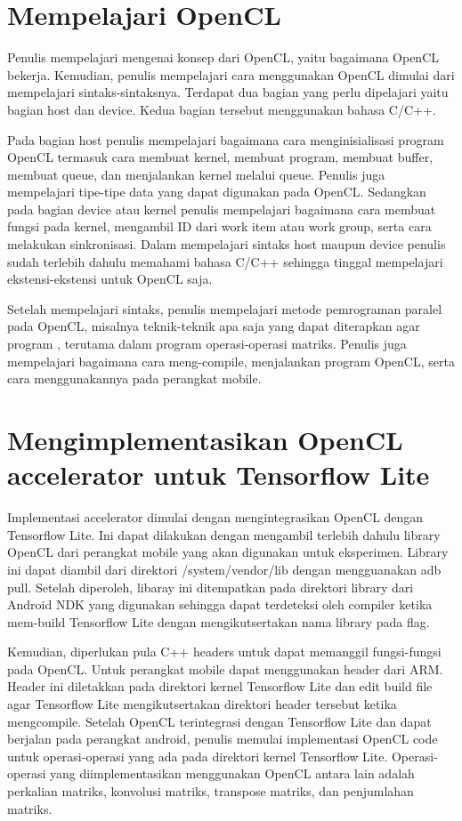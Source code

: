 \section{Mempelajari OpenCL}
Penulis mempelajari mengenai konsep dari OpenCL, yaitu bagaimana OpenCL bekerja. Kemudian, penulis mempelajari cara menggunakan OpenCL dimulai dari mempelajari sintaks-sintaksnya. Terdapat dua bagian yang perlu dipelajari yaitu bagian host dan device. Kedua bagian tersebut menggunakan bahasa C/C++.

Pada bagian host penulis mempelajari bagaimana cara menginisialisasi program OpenCL termasuk cara membuat kernel, membuat program, membuat buffer, membuat queue, dan menjalankan kernel melalui queue. Penulis juga mempelajari tipe-tipe data yang dapat digunakan pada OpenCL. Sedangkan pada bagian device atau kernel penulis mempelajari bagaimana cara membuat fungsi pada kernel, mengambil ID dari work item atau work group, serta cara melakukan sinkronisasi. Dalam mempelajari sintaks host maupun device penulis sudah terlebih dahulu memahami bahasa C/C++ sehingga tinggal mempelajari ekstensi-ekstensi untuk OpenCL saja.
 
Setelah mempelajari sintaks, penulis mempelajari metode pemrograman paralel pada OpenCL, misalnya teknik-teknik apa saja yang dapat diterapkan agar program , terutama dalam program operasi-operasi matriks. Penulis juga mempelajari bagaimana cara meng-compile, menjalankan program OpenCL, serta cara menggunakannya pada perangkat mobile.


\section{Mengimplementasikan OpenCL accelerator untuk Tensorflow Lite }
Implementasi accelerator dimulai dengan mengintegrasikan OpenCL dengan Tensorflow Lite. Ini dapat dilakukan dengan mengambil terlebih dahulu library OpenCL dari perangkat mobile yang akan digunakan untuk eksperimen. Library ini dapat diambil dari direktori /system/vendor/lib dengan mengguanakan adb pull. Setelah diperoleh, libaray ini ditempatkan pada direktori library dari Android NDK yang digunakan sehingga dapat terdeteksi oleh compiler ketika mem-build Tensorflow Lite dengan mengikutsertakan nama library pada flag.

Kemudian, diperlukan pula C++ headers untuk dapat memanggil fungsi-fungsi pada OpenCL. Untuk perangkat mobile dapat menggunakan header dari ARM. Header ini diletakkan pada direktori kernel Tensorflow Lite dan edit build file agar Tensorflow Lite mengikutsertakan direktori header tersebut ketika mengcompile. Setelah OpenCL terintegrasi dengan Tensorflow Lite dan dapat berjalan pada perangkat android, penulis memulai implementasi OpenCL code untuk operasi-operasi \deeplearning \inference yang ada pada direktori kernel Tensorflow Lite. Operasi-operasi yang diimplementasikan menggunakan OpenCL antara lain adalah perkalian matriks, konvolusi matriks, transpose matriks, dan penjumlahan matriks.

